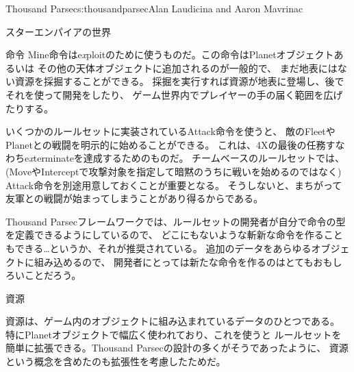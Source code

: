 \begin{aosachapter}{Thousand Parsec}{s:thousandparsec}{Alan Laudicina and Aaron Mavrinac}
\begin{aosasect1}{スターエンパイアの世界}
\begin{aosasect2}{命令}
Mine命令はe\emph{x}ploitのために使うものだ。この命令はPlanetオブジェクトあるいは
その他の天体オブジェクトに追加されるのが一般的で、
まだ地表にはない資源を採掘することができる。
採掘を実行すれば資源が地表に登場し、後でそれを使って開発をしたり、
ゲーム世界内でプレイヤーの手の届く範囲を広げたりする。

いくつかのルールセットに実装されているAttack命令を使うと、
敵のFleetやPlanetとの戦闘を明示的に始めることができる。
これは、4Xの最後の任務すなわちe\emph{x}terminateを達成するためのものだ。
チームベースのルールセットでは、(MoveやInterceptで攻撃対象を指定して暗黙のうちに戦いを始めるのではなく)
Attack命令を別途用意しておくことが重要となる。
そうしないと、まちがって友軍との戦闘が始まってしまうことがあり得るからである。

Thousand Parsecフレームワークでは、ルールセットの開発者が自分で命令の型を定義できるようにしているので、
どこにもないような斬新な命令を作ることもできる…というか、それが推奨されている。
追加のデータをあらゆるオブジェクトに組み込めるので、
開発者にとっては新たな命令を作るのはとてもおもしろいことだろう。

\end{aosasect2}

\begin{aosasect2}{資源}

資源は、ゲーム内のオブジェクトに組み込まれているデータのひとつである。
特にPlanetオブジェクトで幅広く使われており、これを使うと
ルールセットを簡単に拡張できる。Thousand Parsecの設計の多くがそうであったように、
資源という概念を含めたのも拡張性を考慮したためだ。


\end{aosasect2}
\end{aosasect1}
\end{aosachapter}
